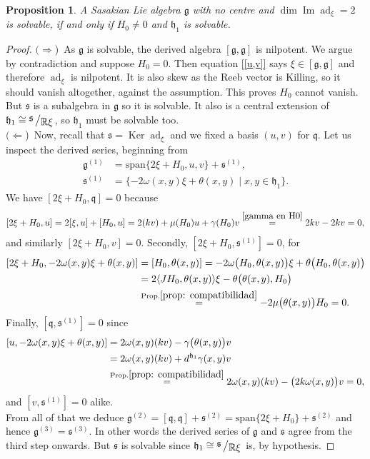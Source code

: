 \documentclass[12pt, twoside]{amsart}
\def\g{\mathfrak{g}}
\def\h{\mathfrak{h}}
\def\q{\mathfrak{q}}
\def\s{\mathfrak s}
\def\R{\mathbb{R}}
\def\ad{\operatorname{ad}}
\renewcommand{\Im}{\operatorname{Im}}
\def\Ker{\operatorname{Ker}}
\newcommand{\bigslant}[2]{{\raisebox{.2em}{$#1$}\left/\raisebox{-.2em}{$#2$}\right.}}
\newcommand{\iso}{\cong}
\newtheorem{prop}[definition]{Proposition}
\theoremstyle{definition}
\begin{document}
\begin{prop}\label{cond g soluble}
A Sasakian Lie algebra $\g$ with no centre and $\dim \Im \ad_{\xi}=2$ is solvable, if and only if $H_{0}\neq 0$ and $\h_1$ is solvable.
\end{prop}
\begin{proof} 
$(\Longrightarrow$)\ As $\g$ is solvable, the derived algebra $[\g,\g]$ is nilpotent. 
We argue by contradiction and suppose $H_{0}= 0$. Then  equation 
\eqref{[u,v]} says $\xi \in [\g,\g]$ and therefore $\ad_{\xi}$ is nilpotent. It is also skew as the Reeb vector is Killing, so it should vanish altogether, against the assumption. This proves $H_0$ cannot vanish. 
But $\s$ is a subalgebra in $\g$ so it is solvable. It also is a central extension of $\h_1\iso \bigslant{\s}{\R\xi}$, so $\h_1$ must be solvable too.\\
%
$(\Longleftarrow$)\ Now, recall that $\s=\Ker \ad_\xi$ and we fixed a basis $(u,v)$ for $\q$.   
Let us inspect the derived series, beginning from 
\begin{equation*}\begin{split}
\g^{(1)} &= \text{span}\{2\xi+H_{0}, u, v\} + \s^{(1)},\\
\s^{(1)} &= \{-2\omega(x,y)\xi+\theta(x,y) \mid  x,y \in \h_1\}.
\end{split}\end{equation*}
We have $[2\xi+H_0,{\q}]=0$ 
because 
$$[2\xi+H_{0},u] = 2[\xi,u]+[H_{0},u] = 
2(kv)+\mu(H_0)u+\gamma(H_0)v \stackrel{\eqref{gamma en H0}}{=} 
2kv-2kv  =0,$$
and similarly $[2\xi+H_0,v]=0$.  Secondly, $[2\xi+H_0,\s^{(1)}]=0$, for  
\begin{equation*}\begin{split}
  [2\xi+H_{0}, -2\omega(x,y)\xi+\theta(x,y)] &=[H_{0},\theta(x,y)]
    =-2\omega\big(H_{0},\theta(x,y)\big)\xi+\theta\big(H_{0},\theta(x,y)\big)\\
    &=2\langle JH_0, \theta(x,y)\rangle\xi-\theta\big(\theta(x,y),H_0\big) \\
 &   \stackrel{\text{Prop.} \ref{prop: compatibilidad}}{=} -2\mu\big(\theta(x,y)\big)H_0  =0.
\end{split}\end{equation*}
Finally, $[{\q},\s^{(1)}]=0$ since
\begin{equation*}\begin{split}
    [u,-2\omega(x,y)\xi+\theta(x,y)]& 
    =2\omega(x,y)(kv)-\gamma\big(\theta(x,y)\big)v \\
  &  =2\omega(x,y)(kv) + d^{\h_1} \gamma(x,y)v \\
&     \stackrel{\text{Prop.} \ref{prop: compatibilidad}}{=} 2\omega(x,y)(kv)-\big(2k\omega(x,y)\big)v  =0,
\end{split}\end{equation*}
and $[v,\s^{(1)}]=0$ alike.\\
From all of that we deduce $\g^{(2)}=[{\q},{\q}]+\s^{(2)}=\text{span}\{2\xi+H_0\}+\s^{(2)}$ 
and hence $\g^{(3)}=\s^{(3)}$. In other words the derived series of  $\g$ and $\s$ agree from the third step onwards. But $\s$ is solvable since $\h_1\iso \bigslant{\s}{\R\xi}$ is, by hypothesis.
\end{proof}
\bigbreak
\end{document}
